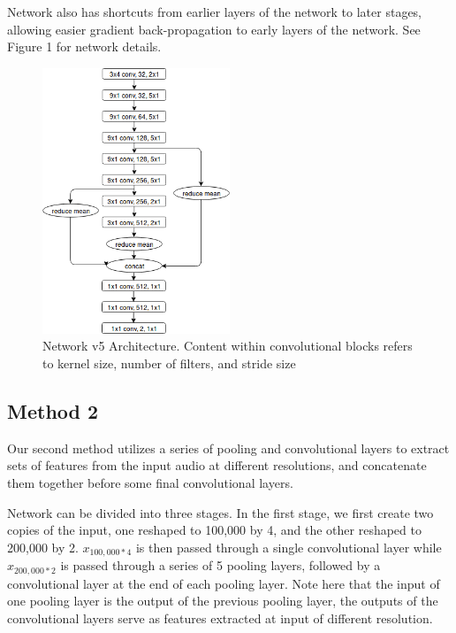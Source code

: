 \documentclass[10pt,twocolumn,letterpaper]{article}
\begin{document}
Network also has shortcuts from earlier layers of the network to later
stages, allowing easier gradient back-propagation to early layers of the
network. See Figure 1 for network details.

\begin{figure}[t]
	\centering
	\includegraphics[width=0.5\textwidth]{v5_diagram}
	\caption{Network v5 Architecture. Content within convolutional blocks
	refers to kernel size, number of filters, and stride size}
\end{figure}


\subsection{Method 2}

Our second method utilizes a series of pooling and convolutional layers to
extract sets of features from the input audio at different resolutions, and
concatenate them together before some final convolutional layers.

Network can be divided into three stages. In the first stage, we first
create two copies of the input, one reshaped to 100,000 by 4, and the other
reshaped to 200,000 by 2. \(x_{100,000*4}\) is then passed through a single
convolutional layer while \(x_{200,000*2}\) is passed through a series of 5
pooling layers, followed by a convolutional layer at the end of each
pooling layer. Note here that the input of one pooling layer is the output
of the previous pooling layer, the outputs of the convolutional layers
serve as features extracted at input of different resolution.
\end{document}
